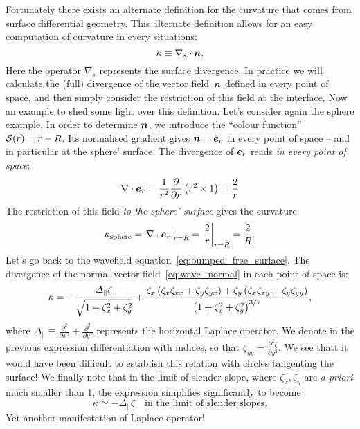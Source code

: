 Fortunately there exists an alternate definition for the curvature that comes from surface differential geometry. This alternate definition allows for an easy computation of curvature in every situations:
\begin{equation}
\kappa \equiv \nabla_s \cdot \bn.
\end{equation}
Here the operator $\nabla_s$ represents the surface divergence. In practice we will calculate the (full) divergence of the vector field~$\bn$ defined in every point of space, and then simply consider the restriction of this field at the interface. Now an example to shed some light over this definition.
 Let's consider again the sphere example. In order to determine $\bn$, we introduce the ``colour function'' $\mathcal S(r) = r - R$. Its normalised gradient gives $\bn = \be_r$ in every point of space -- and in particular at the sphere' surface. The divergence of $\be_r$ reads \textit{in every point of space}:
\begin{equation}
\nabla \cdot \be_r = \frac{1}{r^2} \pd{}{r} \lp r^2 \times 1 \rp = \frac{2}{r}
\end{equation}
The restriction of this field \textit{to the sphere' surface} gives the curvature:
\begin{equation}
\kappa_\text{sphere} = \left.\nabla \cdot \be_r\right|_{r=R} = \left.\frac{2}{r}\right|_{r=R} = \frac{2}{R}.
\end{equation}
 Let's go back to the wavefield equation~\eqref{eq:bumped_free_surface}. The divergence of the normal vector field~\eqref{eq:wave_normal} in each point of space is:
\begin{equation}
\kappa= -\frac{\Delta_\parallel \zeta}{\sqrt{1+\zeta_x^2+\zeta_y^2}} + \frac{\zeta_x\left(\zeta_x \zeta_{xx} + \zeta_y \zeta_{yx}\right) + \zeta_y\left(\zeta_x \zeta_{xy} + \zeta_y \zeta_{yy}\right)}{\left( 1+\zeta_x^2+\zeta_y^2\right)^{3/2}},
\end{equation}
where $\Delta_\parallel \equiv \frac{\partial^2}{\partial x^2} + \frac{\partial^2}{\partial y^2}$ represents the horizontal Laplace operator. We denote in the previous expression differentiation with indices, so that $ \zeta_{yy} = \frac{\partial^2\zeta}{\partial y^2}$. We see thatt it would have been difficult to establish this relation with circles tangenting the surface! We finally note that in the limit of slender slope, where $\zeta_x,\zeta_y$ are \textit{a priori} much smaller than 1, the expression simplifies significantly to become
\begin{equation}
\kappa \simeq - \Delta_\parallel \zeta \quad \text{in the limit of slender slopes}.
\end{equation}
Yet another manifestation of Laplace operator!
